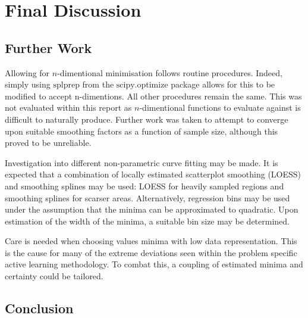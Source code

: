 \chapter{Final Discussion}

\ifpdf
    \graphicspath{{Chapter3/Figs/Raster/}{Chapter3/Figs/PDF/}{Chapter3/Figs/}}
\else
    \graphicspath{{Chapter3/Figs/Vector/}{Chapter3/Figs/}}
\fi

\section{Further Work}
Allowing for $n$-dimentional minimisation follows routine procedures. Indeed, simply using $\text{splprep}$ from the $\text{scipy.optimize}$ package allows for this to be modified to accept n-dimentions. All other procedures remain the same. This was not evaluated within this report as $n$-dimentional functions to evaluate against is difficult to naturally produce. Further work was taken to attempt to converge upon suitable smoothing factors as a function of sample size, although this proved to be unreliable.

Investigation into different non-parametric curve fitting may be made. It is expected that a combination of locally estimated scatterplot smoothing (LOESS) and smoothing splines may be used: LOESS for heavily sampled regions and smoothing splines for scarser areas. Alternatively, regression bins may be used under the assumption that the minima can be approximated to quadratic. Upon estimation of the width of the minima, a suitable bin size may be determined.

Care is needed when choosing values minima with low data representation. This is the cause for many of the extreme deviations seen within the problem specific active learning methodology. To combat this, a coupling of estimated minima and certainty could be tailored. 
\section{Conclusion}
